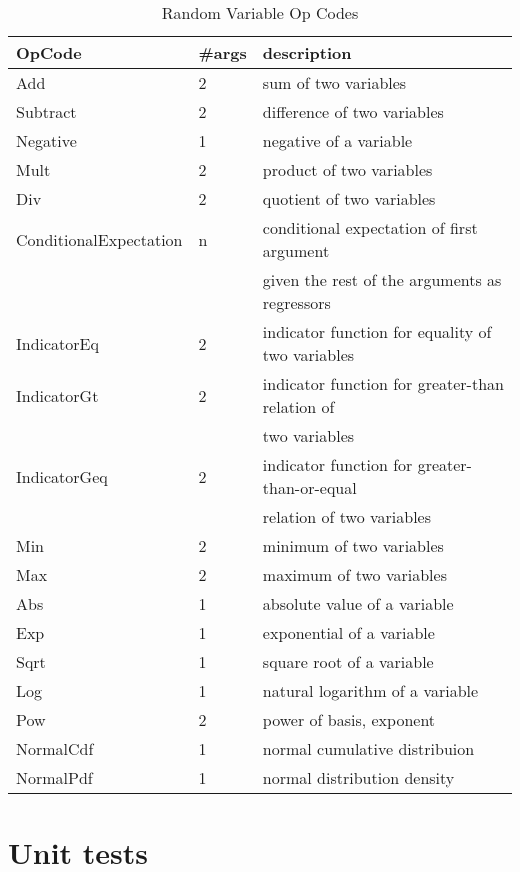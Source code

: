 \documentclass[12pt, a4paper]{article}
\begin{document}
\begin{table}[ht]
  \begin{flushleft}
    \begin{tabular}{|l|l|l|}
      \hline
      OpCode & \#args & description \\ \hline
      Add & 2 & sum of two variables \\ \hline
      Subtract & 2 & difference of two variables \\ \hline
      Negative & 1 & negative of a variable \\ \hline
      Mult & 2 & product of two variables \\ \hline
      Div & 2 & quotient of two variables \\ \hline
      ConditionalExpectation & n & conditional expectation of first argument\\ & & given the rest of the arguments as regressors \\ \hline
      IndicatorEq & 2 & indicator function for equality of two variables \\ \hline
      IndicatorGt & 2 & indicator function for greater-than relation of\\ & & two variables \\ \hline
      IndicatorGeq & 2 & indicator function for greater-than-or-equal\\ & & relation of two variables \\ \hline
      Min & 2 & minimum of two variables \\ \hline
      Max & 2 & maximum of two variables \\ \hline
      Abs & 1 & absolute value of a variable \\ \hline
      Exp & 1 & exponential of a variable \\ \hline
      Sqrt & 1 & square root of a variable \\ \hline
      Log & 1 & natural logarithm of a variable \\ \hline
      Pow & 2 & power of basis, exponent \\ \hline
      NormalCdf & 1 & normal cumulative distribuion \\ \hline
      NormalPdf & 1 & normal distribution density\\ \hline
    \end{tabular}
  \end{flushleft}
\caption{Random Variable Op Codes}
\label{tab_opcodes}
\end{table}

\section{Unit tests}\label{unitTests}
\end{document}
